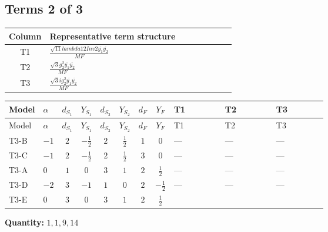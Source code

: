 \documentclass[8pt]{article}
\begin{document}
\begin{landscape}
\subsection*{Terms 2 of 3}
\begin{center}
\begin{tabular}{@{}c >{\raggedright\arraybackslash}p{0.82\linewidth}@{}}
\toprule
Column & Representative term structure \\
\midrule
T1 & \(\displaystyle \frac{\sqrt{11} lambda12Inv2 \overline{y_{1}} \overline{y_{2}}}{MF}\) \\
\midrule
T2 & \(\displaystyle \frac{\sqrt{3} g_{2}^{2} \overline{y_{1}} \overline{y_{2}}}{MF}\) \\
\midrule
T3 & \(\displaystyle \frac{\sqrt{3} i g_{2}^{2} \overline{y_{1}} \overline{y_{2}}}{MF}\) \\
\midrule
\bottomrule
\end{tabular}
\end{center}
\smallskip
\tiny
\begin{longtable}{@{}llcccccc >{\raggedright\arraybackslash}p{0.21\linewidth} >{\raggedright\arraybackslash}p{0.21\linewidth} >{\raggedright\arraybackslash}p{0.21\linewidth}@{}}
\toprule
Model & $\alpha$ & $d_{S_1}$ & $Y_{S_1}$ & $d_{S_2}$ & $Y_{S_2}$ & $d_F$ & $Y_F$ & T1 & T2 & T3 \\
\midrule
\endfirsthead
\toprule
Model & $\alpha$ & $d_{S_1}$ & $Y_{S_1}$ & $d_{S_2}$ & $Y_{S_2}$ & $d_F$ & $Y_F$ & T1 & T2 & T3 \\
\midrule
\endhead
T3-B & $-1$ & $2$ & $-\frac{1}{2}$ & $2$ & $\frac{1}{2}$ & $1$ & $0$ & --- & --- & --- \\
\midrule
T3-C & $-1$ & $2$ & $-\frac{1}{2}$ & $2$ & $\frac{1}{2}$ & $3$ & $0$ & --- & --- & --- \\
\midrule
T3-A & $0$ & $1$ & $0$ & $3$ & $1$ & $2$ & $\frac{1}{2}$ & --- & --- & --- \\
\midrule
T3-D & $-2$ & $3$ & $-1$ & $1$ & $0$ & $2$ & $-\frac{1}{2}$ & --- & --- & --- \\
\midrule
T3-E & $0$ & $3$ & $0$ & $3$ & $1$ & $2$ & $\frac{1}{2}$ & \scriptsize\adjustbox{max width=\linewidth}{$\begin{gathered} \frac{3 \sqrt{11} lambda12Inv2 \overline{y_{1}} \overline{y_{2}}}{22 MF}\end{gathered}$} & \scriptsize\adjustbox{max width=\linewidth}{$\begin{gathered} \frac{49 \sqrt{3} g_{2}^{2} \overline{y_{1}} \overline{y_{2}}}{24 MF}\end{gathered}$} & \scriptsize\adjustbox{max width=\linewidth}{$\begin{gathered} - \frac{\sqrt{3} i g_{2}^{2} \overline{y_{1}} \overline{y_{2}}}{6 MF}\end{gathered}$} \\
\midrule
\bottomrule
\end{longtable}
\clearpage
\noindent\textbf{Quantity: }$\mathrm{1,1,9,14}$\par\smallskip

\end{landscape}
\end{document}
